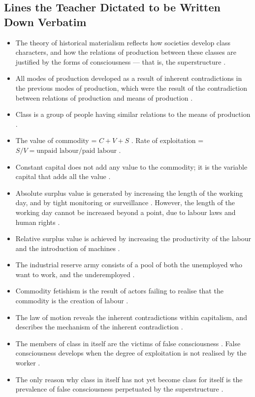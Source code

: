 \subsection{Lines the Teacher Dictated to be Written Down Verbatim}
\begin{itemize}
    \item The theory of historical materialism reflects how societies develop class characters, and how the relations of production between these classes are justified by the forms of consciousness --- that is, the superstructure .
    \item All modes of production developed as a result of inherent contradictions in the previous modes of production, which were the result of the contradiction between relations of production and means of production .
    \item Class is a group of people having similar relations to the means of production .
    \item The value of commodity = $C + V + S$ . Rate of exploitation = $S / V = \text{unpaid labour} / \text{paid labour}$ .
    \item Constant capital does not add any value to the commodity; it is the variable capital that adds all the value .
    \item Absolute surplus value is generated by increasing the length of the working day, and by tight monitoring or surveillance . However, the length of the working day cannot be increased beyond a point, due to labour laws and human rights .
    \item Relative surplus value is achieved by increasing the productivity of the labour and the introduction of machines .
    \item The industrial reserve army consists of a pool of both the unemployed who want to work, and the underemployed .
    \item Commodity fetishism is the result of actors failing to realise that the commodity is the creation of labour .
    \item The law of motion reveals the inherent contradictions within capitalism, and describes the mechanism of the inherent contradiction .
    \item The members of class in itself are the victims of false consciousness . False consciousness develops when the degree of exploitation is not realised by the worker .
    \item The only reason why class in itself has not yet become class for itself is the prevalence of false consciousness perpetuated by the superstructure .

\end{itemize}
